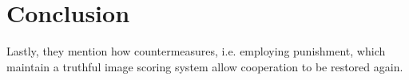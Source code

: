 \documentclass[sigconf]{acmart}
\newcommand{\todo}[1]{{\color{red}{#1}}}
\begin{document}


    \section{Conclusion}\label{sec:conclusion}
    \todo{
    Conclude your report with a brief summary. This can be very short, i.e. 2-3 sentences.
    }
    Lastly, they mention how countermeasures, i.e. employing punishment, which maintain a truthful image scoring system allow cooperation to be restored again. \cite{szamado_deception_2016}
    
    
\end{document}
